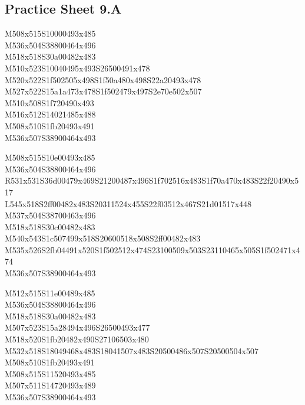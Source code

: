 \documentclass{article}
\begin{document}
\subsection{Practice Sheet 9.A}

\begin{multicols}{5}
\begin{center}

M508x515S10000493x485 %
\\M536x504S38800464x496 %
\\M518x518S30a00482x483 %
\\M510x523S10040495x493S26500491x478 %
\\M520x522S1f502505x498S1f50a480x498S22a20493x478 %
\\M527x522S15a1a473x478S1f502479x497S2e70e502x507 %
\\M510x508S1f720490x493 %
\\M516x512S14021485x488 %
\\M508x510S1fb20493x491 %
\\M536x507S38900464x493 %
\vfil
\columnbreak

M508x515S10e00493x485 %
\\M536x504S38800464x496 %
\\R531x531S36d00479x469S21200487x496S1f702516x483S1f70a470x483S22f20490x517 %
\\L545x518S2ff00482x483S20311524x455S22f03512x467S21d01517x448 %
\\M537x504S38700463x496 %
\\M518x518S30c00482x483 %
\\M540x543S1c507499x518S20600518x508S2ff00482x483 %
\\M535x526S2fb04491x520S1f502512x474S23100509x503S23110465x505S1f502471x474 %
\\M536x507S38900464x493 %
\vfil
\columnbreak

M512x515S11e00489x485 %
\\M536x504S38800464x496 %
\\M518x518S30a00482x483 %
\\M507x523S15a28494x496S26500493x477 %
\\M518x520S1fb20482x490S27106503x480 %
\\M532x518S18049468x483S18041507x483S20500486x507S20500504x507 %
\\M508x510S1fb20493x491 %
\\M508x515S11520493x485 %
\\M507x511S14720493x489 %
\\M536x507S38900464x493 %
\vfil
\columnbreak


\end{center}
\end{multicols}
\end{document}
